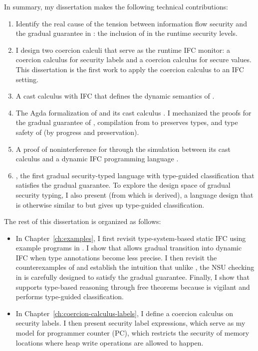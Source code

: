 In summary, my dissertation makes the following technical contributions:

\begin{enumerate}
\item Identify the real cause of the tension between information flow security
  and the gradual guarantee in \GSLRef: the inclusion of \unk in the
  runtime security levels.
\item I design two coercion calculi that serve as the runtime IFC monitor:
   a coercion calculus for security labels and  a coercion
  calculus for secure values. This dissertation is the first work to apply the
  coercion calculus to an IFC setting.
\item A cast calculus \CC with IFC that defines the dynamic semantics of
  \Surface.
\item The Agda formalization of \Surface and its cast calculus \CC. I mechanized
  the proofs for  the gradual guarantee of \Surface, 
  compilation from \Surface to \CC preserves types, and  type safety
  of \CC (by progress and preservation).
\item A proof of noninterference for \Surface through the simulation between its
  cast calculus \CC and a dynamic IFC programming language \DynIFC.
\item \Surface, the first gradual security-typed language with type-guided
  classification that satisfies the gradual guarantee. To explore the design
  space of gradual security typing, I also present \SurfaceOld (from which
  \DynIFC is derived), a language design that is otherwise similar to \Surface
  but gives up type-guided classification.
\end{enumerate}

The rest of this dissertation is organized as follows:

\begin{itemize}
  \item In Chapter~\ref{ch:examples}, I first revisit type-system-based static
    IFC using example programs in \Surface. I show that \Surface allows gradual
    transition into dynamic IFC when type annotations become less precise. I
    then revisit the counterexamples of \textcite{Toro:2018aa} and establish the
    intuition that unlike \GSLRef, the NSU checking in \Surface is carefully
    designed to satisfy the gradual guarantee. Finally, I show that \Surface
    supports type-based reasoning through free theorems because \Surface is
    vigilant and performs type-guided classification.
  \item In Chapter~\ref{ch:coercion-calculus-labels}, I define a coercion
    calculus on security labels. I then present security label expressions,
    which serve as my model for programmer counter (PC), which restricts the
    security of memory locations where heap write operations are allowed to
    happen.
\end{itemize}
